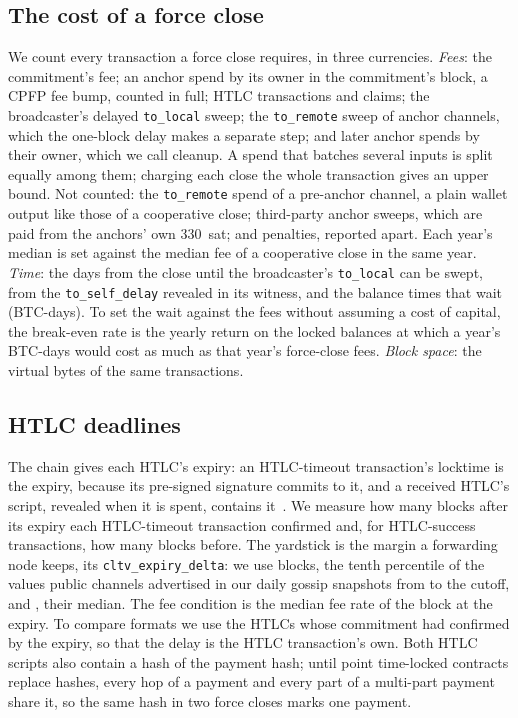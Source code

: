 \subsection{The cost of a force close}
We count every transaction a force close requires, in three currencies. \emph{Fees}: the commitment's fee; an anchor
spend by its owner in the commitment's block, a CPFP fee bump, counted in full; HTLC transactions and claims; the
broadcaster's delayed \texttt{to\_local} sweep; the \texttt{to\_remote} sweep of anchor channels, which the one-block
delay makes a separate step; and later anchor spends by their owner, which we call cleanup. A spend that batches several
inputs is split equally among them; charging each close the whole transaction gives an upper bound. Not counted: the
\texttt{to\_remote} spend of a pre-anchor channel, a plain wallet output like those of a cooperative close; third-party
anchor sweeps, which are paid from the anchors' own 330~sat; and penalties, reported apart. Each year's median is set
against the median fee of a cooperative close in the same year. \emph{Time}: the days from the close until the
broadcaster's \texttt{to\_local} can be swept, from the \texttt{to\_self\_delay} revealed in its witness, and the
balance times that wait (BTC-days). To set the wait against the fees without assuming a cost of capital, the
break-even rate is the yearly return on the locked balances at which a year's BTC-days would cost as much as that
year's force-close fees. \emph{Block space}: the virtual bytes of the same transactions.

\subsection{HTLC deadlines}
\label{sec:htlc-method}
The chain gives each HTLC's expiry: an HTLC-timeout transaction's locktime is the expiry, because its pre-signed
signature commits to it, and a received HTLC's script, revealed when it is spent, contains it~\cite{bolt3}. We measure
how many blocks after its expiry each HTLC-timeout transaction confirmed and, for HTLC-success transactions, how many
blocks before. The yardstick is the margin a forwarding node keeps, its \texttt{cltv\_expiry\_delta}: we use
\HtlcMarginTight{} blocks, the tenth percentile of the values public channels advertised in our daily gossip
snapshots from \CltvDeltaFrom{} to the cutoff, and \HtlcMarginMid, their median.
The fee condition is the median fee rate of the block at the expiry. To compare formats we use the HTLCs whose
commitment had confirmed by the expiry, so that the delay is the HTLC transaction's own. Both HTLC scripts also contain
a hash of the payment hash; until point time-locked contracts replace hashes, every hop of a payment and every part of
a multi-part payment share it, so the same hash in two force closes marks one payment.

